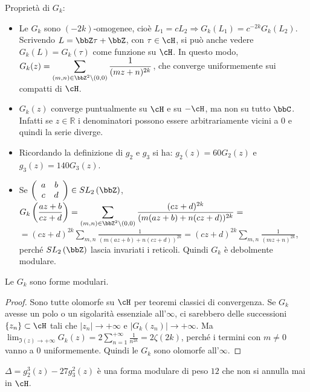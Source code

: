 \begin{osservazione}
Proprietà di $G_k$:

\begin{itemize}
\item Le $G_k$ sono $(-2k)$-omogenee, cioè
$L_1=cL_2 \Rightarrow G_k(L_1)=c^{-2k}G_k(L_2)$.
Scrivendo $L=\bbZ \tau + \bbZ$, con $\tau \in \cH$,
si può anche vedere $G_k(L) = G_k(\tau)$ come funzione su $\cH$.
In questo modo, $\displaystyle{G_k(z)=\sum_{(m,n) \in \bbZ^2 \setminus
(0,0)}{\frac{1}{(mz+n)^{2k}}}}$, che converge uniformemente sui compatti
di $\cH$.
\item $G_k(z)$ converge puntualmente su $\cH$ e su $-\cH$, ma non su tutto $\bbC$. Infatti se $z \in \mathbb{R}$ i denominatori possono
essere arbitrariamente vicini a $0$ e quindi la serie diverge.
\item Ricordando la definizione di $g_2$ e $g_3$ si ha: $g_2(z)=60G_2(z)$ e $g_3(z)=140G_3(z)$.
\item Se $\left( \begin{array}{cc} a & b \\ c & d \end{array} \right) \in
SL_2 \left( \bbZ \right)$,
$\displaystyle{ G_k \left(\frac{az+b}{cz+d} \right) =
\sum_{(m,n) \in \bbZ^2 \setminus (0,0)}
{\frac{(cz+d)^{2k}} {(m(az+b)+n(cz+d))^{2k}}} =}$
$\displaystyle{ =(cz+d)^{2k} \sum_{m,n}{\frac{1} {(m(az+b)+n(cz+d))^{2k}}} =
(cz+d)^{2k} \sum_{m,n}{\frac{1}{(mz+n)^{2k}}} }$, perché
$SL_2 \left( \bbZ \right)$ lascia invariati i reticoli. Quindi $G_k$
è debolmente modulare.
\end{itemize}
\end{osservazione}


\begin{proposizione}
Le $G_k$ sono forme modulari.
\end{proposizione}

\begin{proof}
Sono tutte olomorfe su $\cH$ per teoremi classici di convergenza.
Se $G_k$ avesse un polo o un sigolarità essenziale all'$\infty$, ci sarebbero
delle successioni $\{ z_n \} \subset \cH$ tali che
$|z_n| \rightarrow +\infty$ e $|G_k(z_n)| \rightarrow +\infty$.
Ma $\displaystyle{\lim_{\Im(z) \rightarrow +\infty} G_k(z)=
2 \sum_{n=1}^{+\infty}{\frac{1}{n^{2k}}} = 2 \zeta(2k)}$, perché i termini
con $m \neq 0$ vanno a $0$ uniformemente. Quindi le $G_k$ sono olomorfe
all'$\infty$.
\end{proof}

\begin{osservazione}
$\Delta = g_2 ^3 (z) - 27 g_3 ^2 (z)$ è una forma modulare di peso $12$ che
non si annulla mai in $\cH$.
\end{osservazione}



